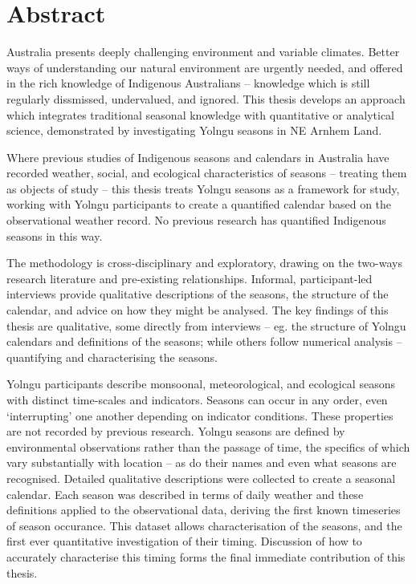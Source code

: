 \chapter{Abstract}

Australia presents deeply challenging environment and variable climates.
Better ways of understanding our natural environment are urgently needed, and
offered in the rich knowledge of Indigenous Australians -- knowledge which
is still regularly dissmissed, undervalued, and ignored.
%
This thesis develops an approach which integrates traditional seasonal knowledge
with quantitative or analytical science, demonstrated by investigating Yolngu
seasons in NE Arnhem Land.

Where previous studies of Indigenous seasons and calendars in Australia have
recorded weather, social, and ecological characteristics of seasons -- treating
them as objects of study -- this thesis treats Yolngu seasons as a framework
for study, working with Yolngu participants to create a quantified calendar
based on the observational weather record.  No previous research has quantified
Indigenous seasons in this way.


The methodology is cross-disciplinary and exploratory, drawing on the two-ways
research literature and pre-existing relationships.  Informal, participant-led
interviews provide qualitative descriptions of the seasons, the structure of
the calendar, and advice on how they might be analysed.
%
The key findings of this thesis are qualitative, some directly from interviews
-- eg. the structure of Yolngu calendars and definitions of the seasons; while
others follow numerical analysis -- quantifying and characterising the seasons.


Yolngu participants describe monsoonal, meteorological, and ecological
seasons with distinct time-scales and indicators.  Seasons can occur in any
order, even `interrupting' one another depending on indicator conditions.
These properties are not recorded by previous research.
%
Yolngu seasons are defined by environmental observations rather than the
passage of time, the specifics of which vary substantially with location --
as do their names and even what seasons are recognised.  Detailed qualitative
descriptions were collected to create a seasonal calendar.
%
Each season was described in terms of daily weather and these definitions
applied to the observational data, deriving the first known timeseries of
season occurance.  This dataset allows characterisation of the seasons,
and the first ever quantitative investigation of their timing.  Discussion
of how to accurately characterise this timing forms the final immediate
contribution of this thesis.

